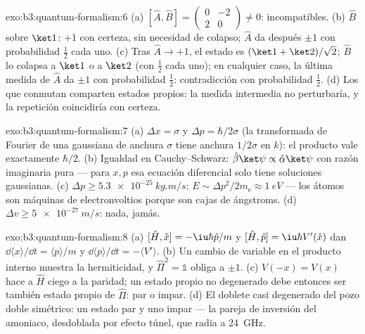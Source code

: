 \begin{solution}{exo:b3:quantum-formalism:6}
(a) $[\hat A, \hat B] = \begin{pmatrix}0 & -2\\ 2 & 0\end{pmatrix}
\neq 0$: incompatibles. (b) $\hat B$ sobre $\ket1$: $+1$ con
certeza, sin necesidad de colapso; $\hat A$ da después $\pm1$ con
probabilidad $\tfrac12$ cada uno. (c) Tras $\hat A \to +1$, el estado es
$(\ket1 + \ket2)/\sqrt2$; $\hat B$ lo colapsa a $\ket1$ o a
$\ket2$ (con $\tfrac12$ cada uno); en cualquier caso, la última medida de
$\hat A$ da $\pm1$ con probabilidad $\tfrac12$: contradicción con
probabilidad $\tfrac12$. (d) Los  que conmutan comparten estados
propios: la medida intermedia no perturbaría, y la repetición coincidiría
con certeza.
\end{solution}

\begin{solution}{exo:b3:quantum-formalism:7}
(a) $\Delta x = \sigma$ y $\Delta p = \hbar/2\sigma$ (la transformada de
Fourier de una gaussiana de anchura $\sigma$ tiene anchura $1/2\sigma$ en
$k$): el producto vale exactamente $\hbar/2$. (b) Igualdad en
Cauchy--Schwarz: $\hat\beta\ket\psi \propto \hat\alpha\ket\psi$ con razón
imaginaria pura --- para $x, p$ esa ecuación diferencial solo tiene
soluciones gaussianas. (c) $\Delta p \ge \qty{5.3e-25}{kg.m/s}$: $E \sim
\Delta p^2/2m_{\text{e}} \approx \qty{1}{eV}$ --- los átomos son máquinas
de electronvoltios porque son cajas de ángstroms. (d)
$\Delta v \ge \qty{5e-27}{m/s}$: nada, jamás.
\end{solution}

\begin{solution}{exo:b3:quantum-formalism:8}
(a) $[\hat H, \hat x] = -\iu\hbar\hat p/m$ y $[\hat H, \hat p] =
\iu\hbar V'(\hat x)$ dan $\dd\langle x\rangle/\dd t = \langle
p\rangle/m$ y $\dd\langle p\rangle/\dd t = -\langle V'\rangle$. (b)
Un cambio de variable en el producto interno muestra la hermiticidad, y
$\hat\Pi^2 = \mathbb 1$ obliga a  $\pm1$. (c) $V(-x) =
V(x)$ hace a $\hat H$ ciego a la paridad; un estado propio no degenerado
debe entonces ser también estado propio de $\hat\Pi$: par o impar. (d) El
doblete casi degenerado del pozo doble simétrico: un estado par y uno impar
--- la pareja de inversión del amoniaco, desdoblada por efecto túnel, que
radia a \qty{24}{GHz}.
\end{solution}

